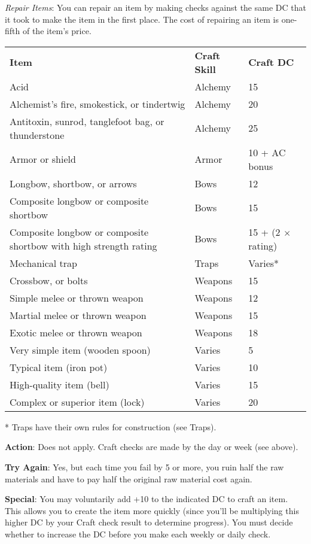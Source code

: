 \textit{Repair Items}: You can repair an item by making checks against the same DC that it took to make the item in the first place. The cost of repairing an item is one-fifth of the item's price.

\begin{table*}
\sffamily
 \begin{tabularx}{\linewidth}{Xll}
  \textbf{Item} & \textbf{Craft Skill} & \textbf{Craft DC}\\
Acid & Alchemy & 15\\
Alchemist's fire, smokestick, or tindertwig & Alchemy & 20\\
Antitoxin, sunrod, tanglefoot bag, or thunderstone & Alchemy & 25\\
Armor or shield & Armor & 10 + AC bonus\\
Longbow, shortbow, or arrows & Bows & 12\\
Composite longbow or composite shortbow & Bows & 15\\
Composite longbow or composite shortbow with high strength rating & Bows & 15 + (2 \mbox{$\times$} rating)\\
Mechanical trap & Traps & Varies*\\
Crossbow, or bolts & Weapons & 15\\
Simple melee or thrown weapon& Weapons & 12\\
Martial melee or thrown weapon & Weapons & 15\\
Exotic melee or thrown weapon & Weapons & 18\\
Very simple item (wooden spoon) & Varies & 5\\
Typical item (iron pot) & Varies & 10\\
High-quality item (bell) & Varies & 15\\
Complex or superior item (lock) & Varies & 20\\
 \end{tabularx}
 * Traps have their own rules for construction (see Traps).
\end{table*}
		
\textbf{Action}: Does not apply. Craft checks are made by the day or week (see above).
				
\textbf{Try Again}: Yes, but each time you fail by 5 or more, you ruin half the raw materials and have to pay half the original raw material cost again.
				
\textbf{Special}: You may voluntarily add +10 to the indicated DC to craft an item. This allows you to create the item more quickly (since you'll be multiplying this higher DC by your Craft check result to determine progress). You must decide whether to increase the DC before you make each weekly or daily check.
				
